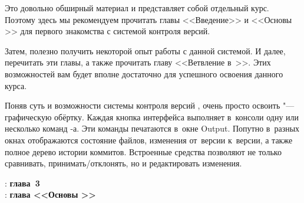 Это довольно обширный материал и представляет собой отдельный курс. Поэтому здесь мы рекомендуем прочитать главы <<Введение>> и <<Основы \git{}>> для первого знакомства с системой контроля версий.

Затем, полезно получить некоторой опыт работы с данной системой. И далее, перечитать эти главы, а также прочитать главу <<Ветвление в~\git{}>>. Этих возможностей вам будет вполне достаточно для успешного освоения данного курса.

Поняв суть и возможности системы контроля версий \git{}, очень просто освоить  "--- графическую обёртку. Каждая кнопка интерфейса выполняет в~консоли одну или несколько команд \git{}-а. Эти команды печатаются в~окне \textenglish{Output}. Попутно в~разных окнах отображаются состояние файлов, изменения от~версии к~версии, а также полное дерево истории коммитов. Встроенные средства позволяют не только сравнивать, принимать/отклонять, но и редактировать изменения.



\WhatToReadSection
\textcite{Stroustrup:2016:ru}: \textbf{глава~3} \\\indent
\textcite{Chacon:2023:ru}: \textbf{глава <<Основы \git{}>>}



